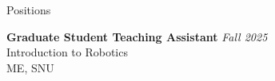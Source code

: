 \begin{rSection}{Positions}

{\bf Graduate Student Teaching Assistant} \hfill {\em Fall 2025} \\
Introduction to Robotics\\
\acf{ME}, \acf{SNU}\\

\end{rSection}
